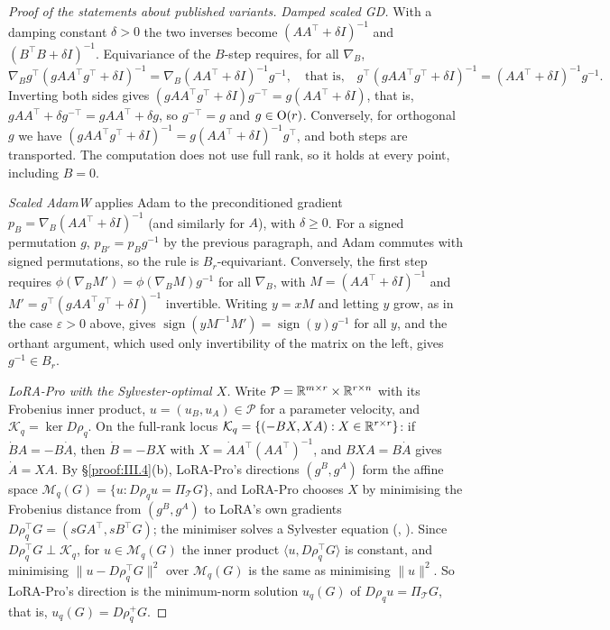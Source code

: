 \begin{proof}[Proof of the statements about published variants]
\emph{Damped scaled GD.} With a damping constant $\delta>0$ the two inverses become $(AA^\top+\delta I)^{-1}$ and
$(B^\top B+\delta I)^{-1}$.
Equivariance of the $B$-step requires, for all $\nabla_B$,
\[\nabla_Bg^\top(gAA^\top g^\top+\delta I)^{-1}=\nabla_B(AA^\top+\delta I)^{-1}g^{-1},\quad\text{that is,}\quad
g^\top(gAA^\top g^\top+\delta I)^{-1}=(AA^\top+\delta I)^{-1}g^{-1}.\]
Inverting both sides gives $(gAA^\top g^\top+\delta I)g^{-\top}=g(AA^\top+\delta I)$, that is,
$gAA^\top+\delta g^{-\top}=gAA^\top+\delta g$, so $g^{-\top}=g$ and $g\in\mathrm{O}(r)$. Conversely, for orthogonal $g$ we have
$(gAA^\top g^\top+\delta I)^{-1}=g(AA^\top+\delta I)^{-1}g^\top$, and both steps are transported. The computation does not use full rank, so it holds at every point, including $B=0$.

\emph{Scaled AdamW} applies Adam to the preconditioned gradient $p_B=\nabla_B(AA^\top+\delta I)^{-1}$ (and similarly for
$A$), with $\delta\ge0$. For a signed permutation $g$, $p_{B'}=p_Bg^{-1}$ by the previous paragraph, and Adam commutes with
signed permutations, so the rule is $B_r$-equivariant. Conversely, the first step requires
$\phi(\nabla_BM')=\phi(\nabla_BM)g^{-1}$ for all $\nabla_B$, with $M=(AA^\top+\delta I)^{-1}$ and
$M'=g^\top(gAA^\top g^\top+\delta I)^{-1}$ invertible. Writing $y=xM$ and letting $y$ grow, as in the case $\varepsilon>0$
above, gives $\operatorname{sign}(yM^{-1}M')=\operatorname{sign}(y)g^{-1}$ for all $y$, and the orthant argument, which
used only invertibility of the matrix on the left, gives $g^{-1}\in B_r$.

\emph{LoRA-Pro with the Sylvester-optimal $X$.} Write $\mathcal P=\mathbb{R}^{m\times r}\times\mathbb{R}^{r\times n}$ with its Frobenius
inner product, $u=(u_B,u_A)\in\mathcal P$ for a parameter velocity, and $\mathcal K_q=\ker D\rho_q$. On the full-rank locus
$\mathcal K_q=\{(-BX,XA):X\in\mathbb{R}^{r\times r}\}$: if $\dot BA=-B\dot A$, then $\dot B=-BX$ with $X=\dot AA^\top(AA^\top)^{-1}$,
and $BXA=B\dot A$ gives $\dot A=XA$. By \S\ref{proof:III.4}(b), LoRA-Pro's directions $(g^B,g^A)$ form the affine space
$\mathcal M_q(G)=\{u:D\rho_qu=\Pi_{\mathcal T}G\}$, and LoRA-Pro chooses $X$ by minimising the Frobenius distance from
$(g^B,g^A)$ to LoRA's own gradients $D\rho_q^\top G=(sGA^\top,sB^\top G)$; the minimiser solves a Sylvester equation
(, ). Since $D\rho_q^\top G\perp\mathcal K_q$, for $u\in\mathcal M_q(G)$ the inner product
$\langle u,D\rho_q^\top G\rangle$ is constant, and minimising $\lVert u-D\rho_q^\top G\rVert^2$ over $\mathcal M_q(G)$ is the
same as minimising $\lVert u\rVert^2$. So LoRA-Pro's direction is the minimum-norm solution $u_q(G)$ of
$D\rho_qu=\Pi_{\mathcal T}G$, that is, $u_q(G)=D\rho_q^+G$.


\end{proof}
